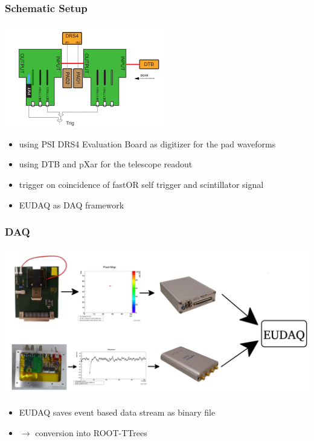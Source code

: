 \documentclass[9pt]{beamer}
\begin{document}
\begin{frame}
	\frametitle{Schematic Setup}
	\begin{center}
		\includegraphics[width=7cm]{Schematics}
	\end{center}
	\begin{itemize}
		\setlength{\itemsep}{\fill}
		\item using PSI DRS4 Evaluation Board as digitizer for the pad waveforms
		\item using DTB and pXar for the telescope readout
		\item trigger on coincidence of fastOR self trigger and scintillator signal
		\item EUDAQ as DAQ framework
	\end{itemize}
\end{frame}
\begin{frame}
	\frametitle{DAQ}
	\begin{center}
		\includegraphics[width=.9\textwidth]{Intro}
	\end{center}
	\begin{itemize}
		\item EUDAQ saves event based data stream as binary file
		\item $\rightarrow$ conversion into ROOT-TTrees
	\end{itemize}
\end{frame}
\end{document}

